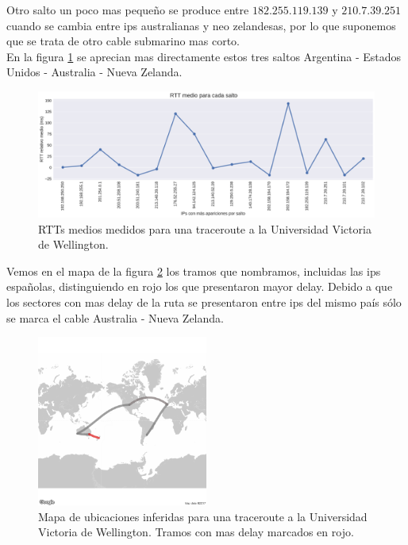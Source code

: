 Otro salto un poco mas pequeño se produce entre $182.255.119.139$ y $210.7.39.251$ cuando se cambia entre ips australianas y neo zelandesas, por lo que suponemos que se trata de otro cable submarino mas corto.
\\

En la figura \ref{fig:victoria-rtts} se aprecian mas directamente estos tres saltos Argentina - Estados Unidos - Australia - Nueva Zelanda.

\begin{figure}[H]
   \centering
       \includegraphics[width=1\textwidth, height=1\textheight, keepaspectratio]{../img/victoria-ac-nz-rtts}
 \caption{RTTs medios medidos para una traceroute a la Universidad Victoria de Wellington.}
 \label{fig:victoria-rtts}
\end{figure}

Vemos en el mapa de la figura \ref{fig:victoria-map} los tramos que nombramos, incluidas las ips españolas, distinguiendo en rojo los que presentaron mayor delay. Debido a que los sectores con mas delay de la ruta se presentaron entre ips del mismo país sólo se marca el cable Australia - Nueva Zelanda.

\begin{figure}[H]
   \centering
       \includegraphics[width=0.5\textwidth, keepaspectratio]{../img/victoria-ac-nz-map}
 \caption{Mapa de ubicaciones inferidas para una traceroute a la Universidad Victoria de Wellington. Tramos con mas delay marcados en rojo.}
 \label{fig:victoria-map}
\end{figure}

